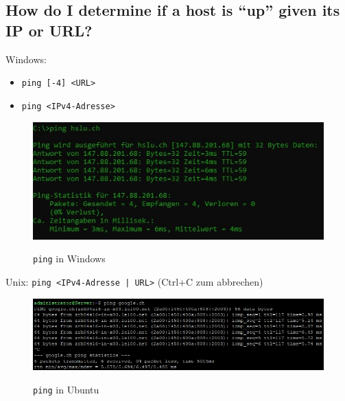 \subsection*{How do I determine if a host is “up” given its IP or URL?}
\begin{multicols}{2}
    Windows:
    \begin{itemize}
        \item \texttt{ping [-4] <URL>}
        \item \texttt{ping <IPv4-Adresse>}
    \end{itemize}
    \begin{figure}[H]
        \begin{center}
        \label{pic:ping_win}
        \includegraphics[width=.5\textwidth]{images/ping_win.jpg}
        \caption{\texttt{ping} in Windows}
        \end{center}
    \end{figure}
    \columnbreak
    Unix: \texttt{ping <IPv4-Adresse | URL>} (Ctrl+C zum abbrechen)
    \vfill\null
    \begin{figure}[H]
        \begin{center}
        \label{pic:ping_unix}
        \includegraphics[width=.5\textwidth]{images/ping_unix.jpg}
        \caption{\texttt{ping} in Ubuntu}
        \end{center}
    \end{figure}
\end{multicols}
